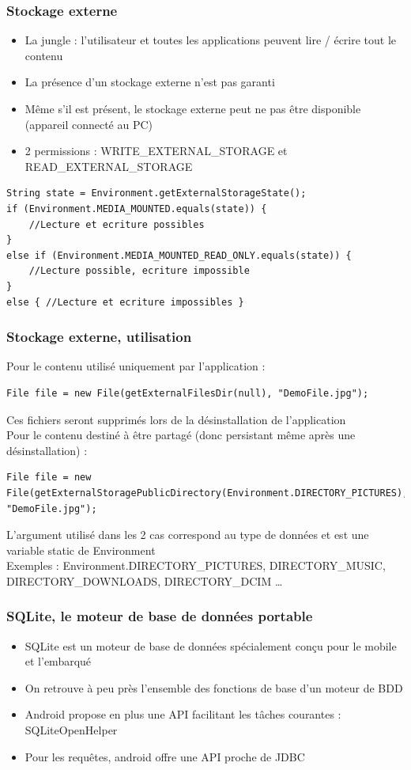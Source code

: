 \documentclass{beamer}
\begin{document}
\begin{frame}[fragile]
\frametitle{Stockage externe}
\begin{itemize}
    \item La jungle : l'utilisateur et toutes les applications peuvent lire / écrire tout le contenu
    \item La présence d'un stockage externe n'est pas garanti
    \item Même s'il est présent, le stockage externe peut ne pas être
    disponible (appareil connecté au PC)
    \item 2 permissions : WRITE\_EXTERNAL\_STORAGE et READ\_EXTERNAL\_STORAGE
\end{itemize}
\begin{lstlisting}
String state = Environment.getExternalStorageState();
if (Environment.MEDIA_MOUNTED.equals(state)) {
    //Lecture et ecriture possibles
} 
else if (Environment.MEDIA_MOUNTED_READ_ONLY.equals(state)) {
    //Lecture possible, ecriture impossible
} 
else { //Lecture et ecriture impossibles }
\end{lstlisting}
\end{frame}
\begin{frame}[fragile]
\frametitle{Stockage externe, utilisation}
Pour le contenu utilisé uniquement par l'application :
\begin{lstlisting}
File file = new File(getExternalFilesDir(null), "DemoFile.jpg");
\end{lstlisting}
Ces fichiers seront supprimés lors de la désinstallation de l'application~\\
Pour le contenu destiné à être partagé (donc persistant même après une
désinstallation) :
\begin{lstlisting}
File file = new File(getExternalStoragePublicDirectory(Environment.DIRECTORY_PICTURES), "DemoFile.jpg");
\end{lstlisting}
L'argument utilisé dans les 2 cas correspond au type de données et est une variable static de Environment\\
Exemples : Environment.DIRECTORY\_PICTURES, DIRECTORY\_MUSIC, DIRECTORY\_DOWNLOADS, DIRECTORY\_DCIM \ldots
\end{frame}
\begin{frame}[fragile]
\frametitle{SQLite, le moteur de base de données portable}
\begin{itemize}
    \item SQLite est un moteur de base de données spécialement conçu pour le
    mobile et l'embarqué
    \item On retrouve à peu près l'ensemble des fonctions de base d'un moteur de BDD
    \item Android propose en plus une API facilitant les tâches courantes : SQLiteOpenHelper
    \item Pour les requêtes, android offre une API proche de JDBC
\end{itemize}
\end{frame}
\end{document}

